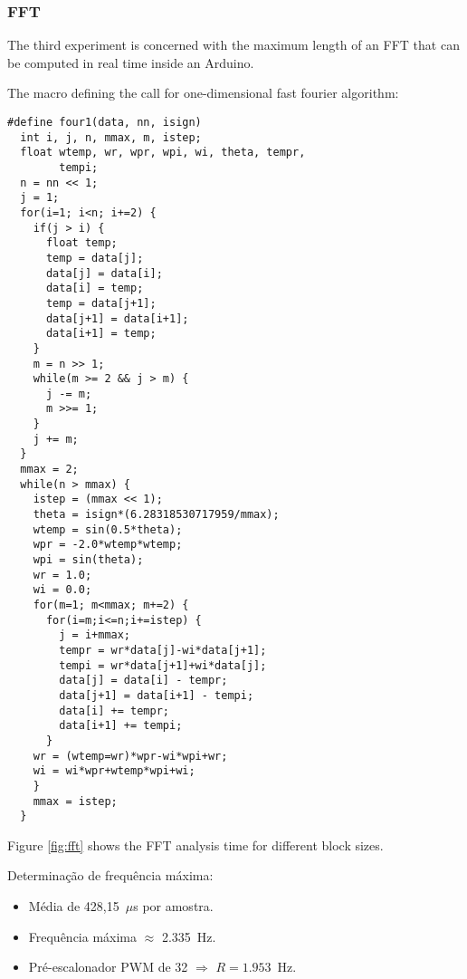 \subsubsection{FFT}

The third experiment is concerned with the maximum length of an FFT that can
be computed in real time inside an Arduino. 

The macro defining the call for one-dimensional fast fourier algorithm:

\begin{lstlisting}
#define four1(data, nn, isign)
  int i, j, n, mmax, m, istep;
  float wtemp, wr, wpr, wpi, wi, theta, tempr,
        tempi;
  n = nn << 1;
  j = 1;
  for(i=1; i<n; i+=2) {
    if(j > i) {
      float temp;
      temp = data[j];
      data[j] = data[i];
      data[i] = temp;
      temp = data[j+1];
      data[j+1] = data[i+1];
      data[i+1] = temp;
    }
    m = n >> 1;
    while(m >= 2 && j > m) {
      j -= m;
      m >>= 1;
    }
    j += m;
  }
  mmax = 2;
  while(n > mmax) {
    istep = (mmax << 1);
    theta = isign*(6.28318530717959/mmax);
    wtemp = sin(0.5*theta);
    wpr = -2.0*wtemp*wtemp;
    wpi = sin(theta);
    wr = 1.0;
    wi = 0.0;
    for(m=1; m<mmax; m+=2) {
      for(i=m;i<=n;i+=istep) {
        j = i+mmax;
        tempr = wr*data[j]-wi*data[j+1];
        tempi = wr*data[j+1]+wi*data[j];
        data[j] = data[i] - tempr;
        data[j+1] = data[i+1] - tempi;
        data[i] += tempr;
        data[i+1] += tempi;
      }
    wr = (wtemp=wr)*wpr-wi*wpi+wr;
    wi = wi*wpr+wtemp*wpi+wi;
    }
    mmax = istep;
  }
\end{lstlisting}


Figure \ref{fig:fft} shows the FFT analysis time for different block sizes.


Determinação de frequência máxima:
\begin{itemize}
  \item Média de 428,15~$\mu$s por amostra.
  \item Frequência máxima $\approx$ 2.335~Hz.
  \item Pré-escalonador PWM de 32 $\Rightarrow$ $R=1.953$~Hz.
\end{itemize}



